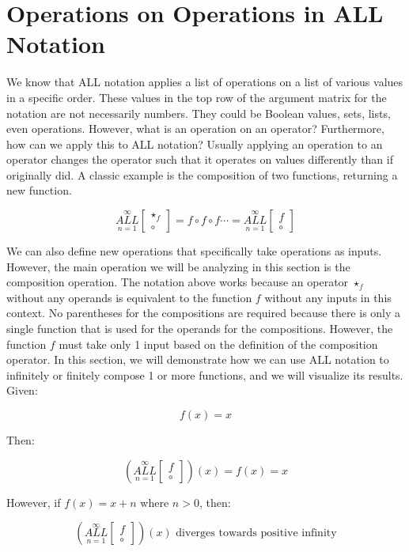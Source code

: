 \documentclass{article}
\begin{document}
\section{Operations on Operations in ALL Notation}

We know that ALL notation applies a list of operations on a list of various values in a specific order. These values in the top row of the argument matrix for the notation are not necessarily numbers. They could be Boolean values, sets, lists, even operations. However, what is an operation on an operator? Furthermore, how can we apply this to ALL notation? Usually applying an operation to an operator changes the operator such that it operates on values differently than if originally did. A classic example is the composition of two functions, returning a new function.

$$\underset{n=1}{\overset{\infty}{ALL}} \begin{bmatrix}
\star_f \\
\circ
\end{bmatrix} = f \circ f \circ f \cdots = \underset{n=1}{\overset{\infty}{ALL}} \begin{bmatrix}
f \\
\circ
\end{bmatrix} $$

We can also define new operations that specifically take operations as inputs. However, the main operation we will be analyzing in this section is the composition operation. The notation above works because an operator $\star_f$ without any operands is equivalent to the function $f$ without any inputs in this context. No parentheses for the compositions are required because there is only a single function that is used for the operands for the compositions. However, the function $f$ must take only 1 input based on the definition of the composition operator. In this section, we will demonstrate how we can use ALL notation to infinitely or finitely compose 1 or more functions, and we will visualize its results. Given:

$$f(x)=x$$

Then:

$$(\underset{n=1}{\overset{\infty}{ALL}} \begin{bmatrix}
f \\
\circ
\end{bmatrix})(x) = f(x) = x$$

However, if $f(x)=x+n$ where $n>0$, then:

$$(\underset{n=1}{\overset{\infty}{ALL}} \begin{bmatrix}
f \\
\circ
\end{bmatrix})(x) \text{ diverges towards positive infinity}$$
\end{document}
